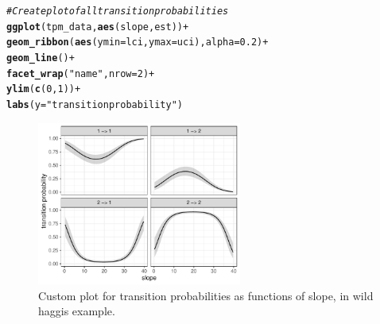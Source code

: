\documentclass[12pt]{article}\usepackage[]{graphicx}\usepackage[]{xcolor}
\makeatletter
\newcommand{\hlnum}[1]{\textcolor[rgb]{0.686,0.059,0.569}{#1}}%
\newcommand{\hlsng}[1]{\textcolor[rgb]{0.192,0.494,0.8}{#1}}%
\newcommand{\hlcom}[1]{\textcolor[rgb]{0.678,0.584,0.686}{\textit{#1}}}%
\newcommand{\hlopt}[1]{\textcolor[rgb]{0,0,0}{#1}}%
\newcommand{\hldef}[1]{\textcolor[rgb]{0.345,0.345,0.345}{#1}}%
\newcommand{\hlkwc}[1]{\textcolor[rgb]{0.333,0.667,0.333}{#1}}%
\newcommand{\hlkwd}[1]{\textcolor[rgb]{0.737,0.353,0.396}{\textbf{#1}}}%
\newenvironment{kframe}{%
 \def\at@end@of@kframe{}%
 \ifinner\ifhmode%
  \def\at@end@of@kframe{\end{minipage}}%
  \begin{minipage}{\columnwidth}%
 \fi\fi%
 \def\FrameCommand##1{\hskip\@totalleftmargin \hskip-\fboxsep
 \colorbox{shadecolor}{##1}\hskip-\fboxsep
     \hskip-\linewidth \hskip-\@totalleftmargin \hskip\columnwidth}%
 \MakeFramed {\advance\hsize-\width
   \@totalleftmargin\z@ \linewidth\hsize
   \@setminipage}}%
 {\par\unskip\endMakeFramed%
 \at@end@of@kframe}
\newenvironment{knitrout}{}{} %
\makeatother
\begin{document}
\begin{knitrout}
\begin{kframe}
\begin{alltt}
\hlcom{# Create plot of all transition probabilities}
\hlkwd{ggplot}\hldef{(tpm_data,} \hlkwd{aes}\hldef{(slope, est))} \hlopt{+}
    \hlkwd{geom_ribbon}\hldef{(}\hlkwd{aes}\hldef{(}\hlkwc{ymin} \hldef{= lci,} \hlkwc{ymax} \hldef{= uci),} \hlkwc{alpha} \hldef{=} \hlnum{0.2}\hldef{)} \hlopt{+}
    \hlkwd{geom_line}\hldef{()} \hlopt{+}
    \hlkwd{facet_wrap}\hldef{(}\hlsng{"name"}\hldef{,} \hlkwc{nrow} \hldef{=} \hlnum{2}\hldef{)} \hlopt{+}
    \hlkwd{ylim}\hldef{(}\hlkwd{c}\hldef{(}\hlnum{0}\hldef{,} \hlnum{1}\hldef{))} \hlopt{+}
    \hlkwd{labs}\hldef{(}\hlkwc{y} \hldef{=} \hlsng{"transition probability"}\hldef{)}
\end{alltt}
\end{kframe}
\end{knitrout}
\begin{figure}[htbp]
\center
\includegraphics[width=0.6\textwidth]{plot_wildHaggis.pdf}
\caption{Custom plot for transition probabilities as functions of slope, in wild haggis example.}
\end{figure}
\end{document}

